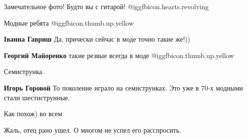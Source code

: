  
 
 
 
 

Замечательное фото! Будто вы с гитарой! @igg{fbicon.hearts.revolving} 

Модные ребята @igg{fbicon.thumb.up.yellow} 

\textbf{Іванна Гавриш} Да, прически сейчас в моде точно такие же!))

\textbf{Георгий Майоренко} такие резвые всегда в моде  @igg{fbicon.thumb.up.yellow} 

Семиструнка.

\textbf{Игорь Горовой} То поколение играло на семиструнках. Это уже в 70-х модными стали шестиструнные.

Как похож) во всем

Жаль, отец рано ушел. О многом не успел его расспросить.
